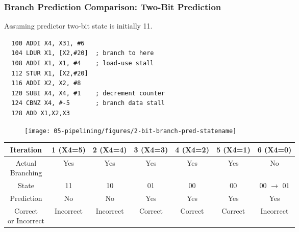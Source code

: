 \begin{frame}[fragile]\frametitle{Branch Prediction Comparison: Two-Bit Prediction}
Assuming predictor two-bit state is initially 11.
\begin{multicols}{2}
{\tiny
\begin{verbatim}
  100 ADDI X4, X31, #6
  104 LDUR X1, [X2,#20]  ; branch to here
  108 ADDI X1, X1, #4    ; load-use stall
  112 STUR X1, [X2,#20]
  116 ADDI X2, X2, #8
  120 SUBI X4, X4, #1    ; decrement counter
  124 CBNZ X4, #-5       ; branch data stall
  128 ADD X1,X2,X3       
\end{verbatim}
}
\columnbreak
\begin{figure}[H]
\centering
	{\texttt{[image: 05-pipelining/figures/2-bit-branch-pred-statename]}}
\end{figure}    
\end{multicols}
{\footnotesize
\begin{center}
	\begin{tabular}{c|cccccc}
Iteration &  1 (X4=5) & 2 (X4=4) & 3 (X4=3) & 4 (X4=2) & 5 (X4=1) & 6 (X4=0) \\\hline
\makecell{Actual\\Branching} & Yes & Yes & Yes & Yes & Yes & No \\ \hline
State & 11 & 10 & 01 & 00 & 00 & 00 {$\rightarrow$ 01}\\ \hline
Prediction & No & No & Yes & Yes & Yes & Yes \\ \hline
\makecell{Correct \\or Incorrect} & Incorrect & Incorrect & Correct & Correct & Correct & Incorrect \\ \hline
\end{tabular}
\end{center}
}
\end{frame}


